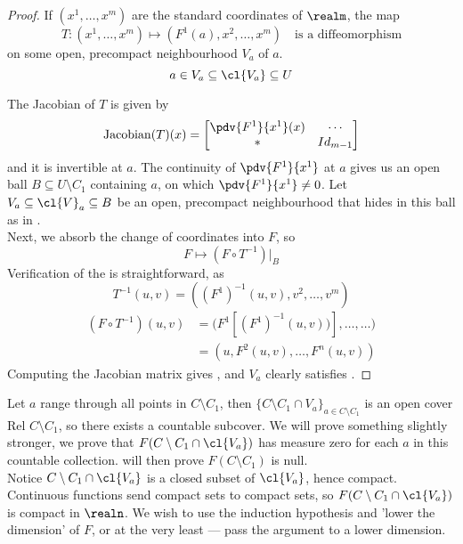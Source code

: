 \documentclass[../main-v2-manifolds.tex]{subfiles}
\begin{document}
\begin{proof}
If $(x^1,\ldots,x^m)$ are the standard coordinates of $\realm$, the map 
    \[
        T: (x^1,\ldots,x^m)\mapsto (F^1(a),x^2,\ldots,x^m)\quad\text{is a diffeomorphism}
    \]
    on some open, precompact neighbourhood $V_a$ of $a$.
    \[
        a\in V_a\subseteq \cl{V_a}\subseteq U
    \]
    
    The Jacobian of $T$ is given by
    \[
        \operatorname{Jacobian}(T)(x)=\begin{bmatrix}
            \pdv{F^1}{x^1}(x) & \cdots \\ * & Id_{m-1}
        \end{bmatrix}
    \]
    and it is invertible at $a$. The continuity of $\pdv{F^1}{x^1}$ at $a$ gives us an open ball $B\subseteq U\setminus C_1$ containing $a$, on which $\pdv{F^1}{x^1}\neq 0$. Let $V_a\subseteq\cl{V}_a\subseteq B$ be an open, precompact neighbourhood that hides in this ball as in . \\

    Next, we absorb the change of coordinates into $F$, so
    \[
        F\mapsto (F\circ T^{-1})|_{B}
    \]
    Verification of the  is straightforward, as
    \[
    T^{-1}(u,v) = ((F^1)^{-1}(u,v), v^2,\ldots,v^m)
    \]
    \begin{align*}
        (F\circ T^{-1})(u,v) 
        &= \biggl(F^1[(F^1)^{-1}(u,v))], \ldots,\ldots\biggr)\\
        &= (u, F^2(u,v),\ldots, F^n(u,v))
    \end{align*}
    Computing the Jacobian matrix gives , and $V_a$ clearly satisfies .
\end{proof}

Let $a$ range through all points in $C\setminus C_1$, then $\{C\setminus C_1\cap V_a\}_{a\in C\setminus C_1}$ is an open cover Rel $C\setminus C_1$, so there exists a countable subcover. We will prove something slightly stronger, we prove that $F(C\setminus C_1\cap \cl{V_a})$ has measure zero for each $a$ in this countable collection.  will then prove $F(C\setminus C_1)$ is null.\\

Notice $C\setminus C_1\cap \cl{V_a}$ is a closed subset of $\cl{V_a}$, hence compact. Continuous functions send compact sets to compact sets, so $F(C\setminus C_1\cap \cl{V_a})$ is compact in $\realn$. We wish to use the induction hypothesis and 'lower the dimension' of $F$, or at the very least — pass the argument to a lower dimension.
\end{document}

